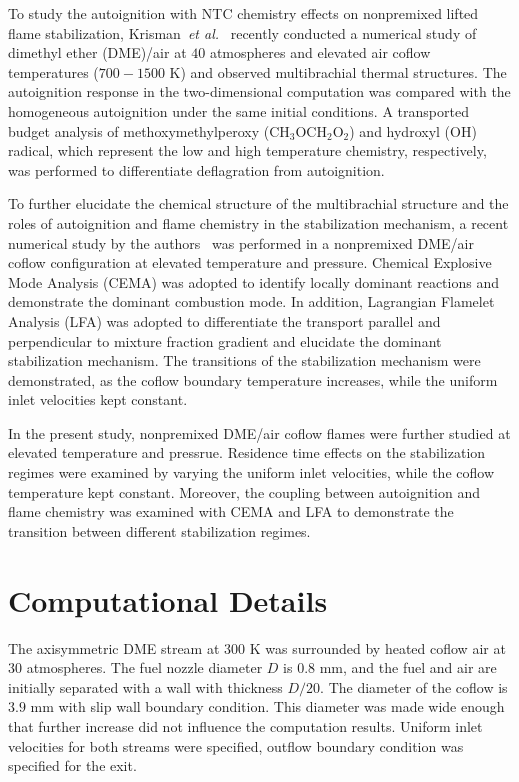 \documentclass{wssci}
\begin{document}
To study the autoignition with NTC chemistry effects on nonpremixed lifted flame stabilization, Krisman~\emph{et al.}~\cite{krisman14} recently conducted a numerical study of dimethyl ether (DME)/air at $40$ atmospheres and elevated air coflow temperatures ($700-1500$ K) and observed multibrachial thermal structures.  The autoignition response in the two-dimensional computation was compared with the homogeneous autoignition under the same initial conditions.  A transported budget analysis of methoxymethylperoxy (CH$_3$OCH$_2$O$_2$) and hydroxyl (OH) radical, which represent the low and high temperature chemistry, respectively, was performed to differentiate deflagration from autoignition.  

To further elucidate the chemical structure of the multibrachial structure and the roles of autoignition and flame chemistry in the stabilization mechanism, a recent numerical study by the authors~\cite{deng15} was performed in a nonpremixed DME/air coflow configuration at elevated temperature and pressure.  Chemical Explosive Mode Analysis (CEMA) was adopted to identify locally dominant reactions and demonstrate the dominant combustion mode.  In addition, Lagrangian Flamelet Analysis (LFA) was adopted to differentiate the transport parallel and perpendicular to mixture fraction gradient and elucidate the dominant stabilization mechanism.  The transitions of the stabilization mechanism were demonstrated, as the coflow boundary temperature increases, while the uniform inlet velocities kept constant.

In the present study, nonpremixed DME/air coflow flames were further studied at elevated temperature and pressrue.  Residence time effects on the stabilization regimes were examined by varying the uniform inlet velocities, while the coflow temperature kept constant.  Moreover, the coupling between autoignition and flame chemistry was examined with CEMA and LFA to demonstrate the transition between different stabilization regimes.                         

\section{Computational Details}

The axisymmetric DME stream at $300$ K was surrounded by heated coflow air at $30$ atmospheres.  The fuel nozzle diameter $D$ is $0.8$ mm, and the fuel and air are initially separated with a wall with thickness $D/20$.  The diameter of the coflow is $3.9$ mm with slip wall boundary condition.  This diameter was made wide enough that further increase did not influence the computation results.  Uniform inlet velocities for both streams were specified, outflow boundary condition was specified for the exit.  
\end{document}
